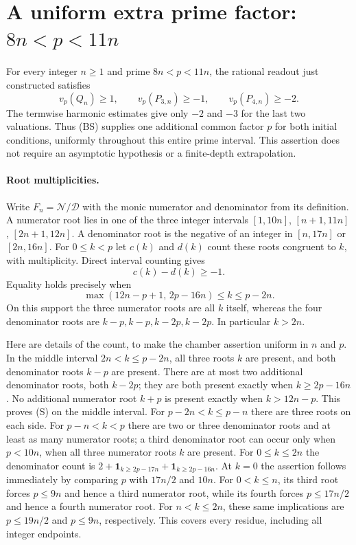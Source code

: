 \section{A uniform extra prime factor: $8n<p<11n$}
For every integer $n\ge1$ and prime $8n<p<11n$, the rational readout just
constructed satisfies
\[
 v_p(Q_n)\ge1,\qquad v_p(P_{3,n})\ge-1,\qquad
 v_p(P_{4,n})\ge-2.                                      \tag{BS}
\]
The termwise harmonic estimates give only $-2$ and $-3$ for the last two
valuations.  Thus (BS) supplies one additional common factor $p$ for both
initial conditions, uniformly throughout this entire prime interval.
This assertion does not require an asymptotic hypothesis or a finite-depth
extrapolation.

\paragraph{Root multiplicities.}
Write $F_n=\mathcal N/\mathcal D$ with the monic numerator and denominator
from its definition.  A numerator root lies in one of the three integer
intervals $[1,10n]$, $[n+1,11n]$, $[2n+1,12n]$.  A denominator root is the
negative of an integer in $[n,17n]$ or $[2n,16n]$.
For $0\le k<p$ let $c(k)$ and $d(k)$ count these roots congruent to $k$,
with multiplicity.  Direct interval counting gives
\[
 c(k)-d(k)\ge-1.
\]
Equality holds precisely when
\[
 \max(12n-p+1,\,2p-16n)\le k\le p-2n.                  \tag{S}
\]
On this support the three numerator roots are all $k$ itself, whereas the
four denominator roots are $k-p,k-p,k-2p,k-2p$.
In particular $k>2n$.

Here are details of the count, to make the chamber assertion uniform in
$n$ and $p$.  In the middle interval $2n<k\le p-2n$, all three roots $k$
are present, and both denominator roots $k-p$ are present.  There are at
most two additional denominator roots, both $k-2p$; they are both present
exactly when $k\ge2p-16n$.  No additional numerator root $k+p$ is present
exactly when $k>12n-p$.  This proves (S) on the middle interval.
For $p-2n<k\le p-n$ there are three roots on each side.  For $p-n<k<p$
there are two or three denominator roots and at least as many numerator
roots; a third denominator root can occur only when $p<10n$, when all
three numerator roots $k$ are present.
For $0\le k\le2n$ the denominator count is
$2+\mathbf1_{k\ge2p-17n}+\mathbf1_{k\ge2p-16n}$.
At $k=0$ the assertion follows immediately by comparing $p$ with
$17n/2$ and $10n$.  For $0<k\le n$, its third root forces $p\le9n$ and
hence a third numerator root, while its fourth forces $p\le17n/2$ and
hence a fourth numerator root.  For $n<k\le2n$, these same implications
are $p\le19n/2$ and $p\le9n$, respectively.  This covers every residue,
including all integer endpoints.

